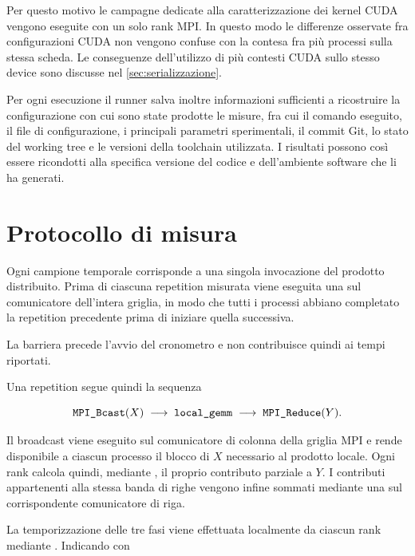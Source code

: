 Per questo motivo le campagne dedicate alla caratterizzazione dei kernel
CUDA vengono eseguite con un solo rank MPI. In questo modo le differenze
osservate fra configurazioni CUDA non vengono confuse con la contesa fra
più processi sulla stessa scheda. Le conseguenze dell'utilizzo di più
contesti CUDA sullo stesso device sono discusse nel
\cref{sec:serializzazione}.

Per ogni esecuzione il runner salva inoltre informazioni sufficienti a
ricostruire la configurazione con cui sono state prodotte le misure, fra
cui il comando eseguito, il file di configurazione, i principali parametri
sperimentali, il commit Git, lo stato del working tree e le versioni della
toolchain utilizzata. I risultati possono così essere ricondotti alla
specifica versione del codice e dell'ambiente software che li ha generati.

\section{Protocollo di misura}
\label{sec:protocollo-misura}

Ogni campione temporale corrisponde a una singola invocazione del prodotto
distribuito. Prima di ciascuna repetition misurata viene eseguita una
 sul comunicatore dell'intera griglia, in modo che tutti
i processi abbiano completato la repetition precedente prima di iniziare
quella successiva.

La barriera precede l'avvio del cronometro e non contribuisce quindi ai
tempi riportati.

Una repetition segue quindi la sequenza

\begin{equation}
\text{\texttt{MPI\_Bcast}}(X)
\;\longrightarrow\;
\text{\texttt{local\_gemm}}
\;\longrightarrow\;
\text{\texttt{MPI\_Reduce}}(Y).
\label{eq:sequenza-repetition}
\end{equation}

Il broadcast viene eseguito sul comunicatore di colonna della griglia MPI
e rende disponibile a ciascun processo il blocco di $X$ necessario al
prodotto locale. Ogni rank calcola quindi, mediante ,
il proprio contributo parziale a $Y$. I contributi appartenenti alla
stessa banda di righe vengono infine sommati mediante una
 sul corrispondente comunicatore di riga.

La temporizzazione delle tre fasi viene effettuata localmente da ciascun
rank mediante . Indicando con

